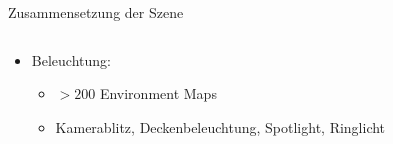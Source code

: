 \begin{frame}{Zusammensetzung der Szene}
\begin{columns}
\begin{column}{0.6\linewidth}
\begin{itemize}
                \item<5-> Beleuchtung:
                      \vspace*{-0.1cm}
                      \begin{itemize}\footnotesize
                          \item $>200$ Environment Maps
                          \item Kamerablitz, Deckenbeleuchtung, Spotlight, Ringlicht
                      \end{itemize}
                      \vspace*{-0.15cm}
            \end{itemize}

        \end{column}
        \begin{column}{0.4\linewidth}


\end{column}
\end{columns}
\end{frame}

